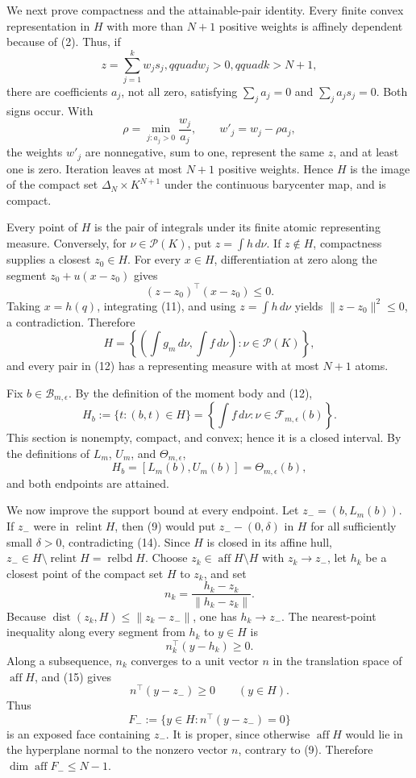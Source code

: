We next prove compactness and the attainable-pair identity.  Every finite convex representation in \(H\) with more than \(N+1\) positive weights is affinely dependent because of (2).  Thus, if
\[
 z=\sum_{j=1}^k w_js_j,qquad w_j>0,qquad k>N+1,
\]
there are coefficients \(a_j\), not all zero, satisfying \(\sum_ja_j=0\) and \(\sum_ja_js_j=0\).  Both signs occur.  With
\[
 \rho=\min_{j:a_j>0}\frac{w_j}{a_j},\qquad w'_j=w_j-\rho a_j,
\tag{10}
\]
the weights \(w'_j\) are nonnegative, sum to one, represent the same \(z\), and at least one is zero.  Iteration leaves at most \(N+1\) positive weights.  Hence \(H\) is the image of the compact set \(\Delta_N\times K^{N+1}\) under the continuous barycenter map, and is compact.

Every point of \(H\) is the pair of integrals under its finite atomic representing measure.  Conversely, for \(\nu\in\mathcal P(K)\), put \(z=\int h\,d\nu\).  If \(z\notin H\), compactness supplies a closest \(z_0\in H\).  For every \(x\in H\), differentiation at zero along the segment \(z_0+u(x-z_0)\) gives
\[
 (z-z_0)^{\top}(x-z_0)\leq0.
\tag{11}
\]
Taking \(x=h(q)\), integrating (11), and using \(z=\int h\,d\nu\) yields \(\lVert z-z_0\rVert^2\leq0\), a contradiction.  Therefore
\[
 H=
 \left\{\left(\int g_m\,d\nu,\int f\,d\nu\right):
 \nu\in\mathcal P(K)\right\},
\tag{12}
\]
and every pair in (12) has a representing measure with at most \(N+1\) atoms.

Fix \(b\in\mathcal B_{m,\epsilon}\).  By the definition of the moment body and (12),
\[
 H_b:=\{t:(b,t)\in H\}
 =\left\{\int f\,d\nu:\nu\in\mathcal F_{m,\epsilon}(b)\right\}.
\tag{13}
\]
This section is nonempty, compact, and convex; hence it is a closed interval.  By the definitions of \(L_m\), \(U_m\), and \(\Theta_{m,\epsilon}\),
\[
 H_b=[L_m(b),U_m(b)]=\Theta_{m,\epsilon}(b),
\tag{14}
\]
and both endpoints are attained.

We now improve the support bound at every endpoint.  Let \(z_-=(b,L_m(b))\).  If \(z_-\) were in \(\operatorname{relint}H\), then (9) would put \(z_--(0,\delta)\) in \(H\) for all sufficiently small \(\delta>0\), contradicting (14).  Since \(H\) is closed in its affine hull, \(z_-\in H\setminus\operatorname{relint}H=\operatorname{relbd}H\).  Choose \(z_k\in\operatorname{aff}H\setminus H\) with \(z_k\to z_-\), let \(h_k\) be a closest point of the compact set \(H\) to \(z_k\), and set
\[
 n_k=\frac{h_k-z_k}{\lVert h_k-z_k\rVert}.
\]
Because \(\operatorname{dist}(z_k,H)\leq\lVert z_k-z_-\rVert\), one has \(h_k\to z_-\).  The nearest-point inequality along every segment from \(h_k\) to \(y\in H\) is
\[
 n_k^{\top}(y-h_k)\geq0.
\tag{15}
\]
Along a subsequence, \(n_k\) converges to a unit vector \(n\) in the translation space of \(\operatorname{aff}H\), and (15) gives
\[
 n^{\top}(y-z_-)\geq0\qquad(y\in H).
\tag{16}
\]
Thus
\[
 F_-:=\{y\in H:n^{\top}(y-z_-)=0\}
\tag{17}
\]
is an exposed face containing \(z_-\).  It is proper, since otherwise \(\operatorname{aff}H\) would lie in the hyperplane normal to the nonzero vector \(n\), contrary to (9).  Therefore \(\dim\operatorname{aff}F_-\leq N-1\).

